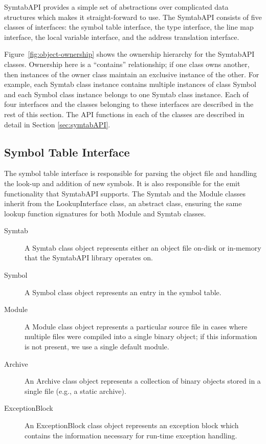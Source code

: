 SymtabAPI provides a simple set of abstractions over complicated data structures
which makes it straight-forward to use. The SymtabAPI consists of five classes of
interfaces: the symbol table interface, the type interface, the line map
interface, the local variable interface, and the address translation interface. 

Figure~\ref{fig:object-ownership} shows the ownership hierarchy for the
SymtabAPI classes. Ownership here is a ``contains'' relationship; if one
class owns another, then instances of the owner class maintain an exclusive
instance of the other. For example, each Symtab class instance contains multiple
instances of class Symbol and each Symbol class instance belongs to one Symtab
class instance. Each of four interfaces and the classes belonging to these
interfaces are described in the rest of this section. The API functions in each
of the classes are described in detail in Section \ref{sec:symtabAPI}.

\subsection{Symbol Table Interface}

The symbol table interface is responsible for parsing the object file and
handling the look-up and addition of new symbols. It is also responsible for the
emit functionality that SymtabAPI supports. The Symtab and the Module classes
inherit from the LookupInterface class, an abstract class, ensuring the same
lookup function signatures for both Module and Symtab classes. 

\begin{description}
\item[Symtab] A Symtab class object represents either an object file on-disk or in-memory that the SymtabAPI library operates on.
\item[Symbol] A Symbol class object represents an entry in the symbol table.
\item[Module] A Module class object represents a particular source file in cases where multiple files were compiled into a single binary object; if this information is not present, we use a single default module.
\item[Archive] An Archive class object represents a collection of binary objects stored in a single file (e.g., a static archive). 
\item[ExceptionBlock] An ExceptionBlock class object represents an exception block which contains the information necessary for run-time exception handling.
\end{description}

